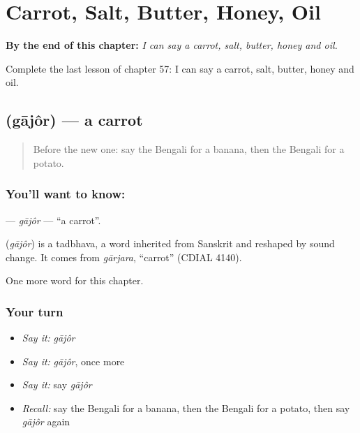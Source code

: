 
\chapter{Carrot, Salt, Butter, Honey, Oil}
\label{ch:bn-carrot-salt-butter-honey-oil}

\begin{chapteropening}
\textbf{By the end of this chapter:} \emph{I can say a carrot, salt, butter, honey and oil.}

Complete the last lesson of chapter 57: I can say a carrot, salt, butter, honey and oil.
\end{chapteropening}

\section[\texorpdfstring{\bn{গাজর} (gājôr)}{গাজর (gājôr)}]{ (gājôr) — a carrot}

\label{lesson:BN-C57-gajor}



\begin{quote}
Before the new one: say the Bengali for a banana, then the Bengali for a potato.
\end{quote}

\subsection*{You'll want to know: }
\textbf{} — \emph{gājôr} — \textquotedblleft{}a carrot\textquotedblright{}.

\begin{cousinweb}
\textbf{} (\emph{gājôr}) is a tadbhava, a word inherited from Sanskrit and reshaped by sound change. It comes from \emph{gārjara}, \textquotedblleft{}carrot\textquotedblright{} (CDIAL 4140).
\end{cousinweb}

\begin{grammarlens}[title={What you've built}]
One more word for this chapter.
\end{grammarlens}

\subsection*{Your turn}
\begin{itemize}
\raggedright
  \item \emph{Say it:} \emph{gājôr}
  \item \emph{Say it:} \emph{gājôr}, once more
  \item \emph{Say it:} say \emph{gājôr}
  \item \emph{Recall:} say the Bengali for a banana, then the Bengali for a potato, then say \emph{gājôr} again
\end{itemize}

